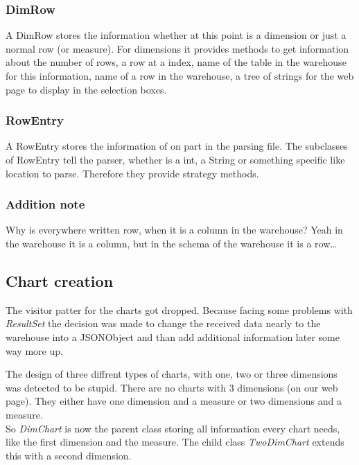 \subsubsection{DimRow}
A DimRow stores the information whether at this point is a dimension or just a normal row (or measure).
For dimensions it provides methods to get information about the number of rows, a row at a index,
name of the table in the warehouse for this information, name of a row in the warehouse, 
a tree of strings for the web page to display in the selection boxes.


\subsubsection{RowEntry}
A RowEntry stores the information of on part in the parsing file. The subclasses of RowEntry
tell the parser, whether is a int, a String or something specific like location to parse. Therefore
they provide strategy methods.


\subsubsection{Addition note}
Why is everywhere written row, when it is a column in the warehouse? Yeah in the warehouse
it is a column, but in the schema of the warehouse it is a row\ldots




\subsection{Chart creation}
The visitor patter for the charts got dropped. Because facing some problems with \textit{ResultSet}
the decision was made to change the received data nearly to the warehouse into a JSONObject
and than add additional information later some way more up.

The design of three diffrent types of charts, with one, two or three dimensions was detected to
be stupid. There are no charts with 3 dimensions (on our web page). They either have one dimension and a measure
or two dimensions and a measure.\\
So \textit{DimChart} is now the parent class storing all information every chart needs, like
the first dimension and the measure. The child class \textit{TwoDimChart} extends this with a second dimension.

